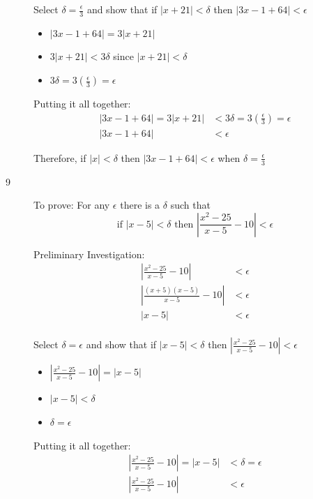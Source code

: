 \documentclass{exam}
\begin{document}
\begin{description}
Select $\delta = \frac{\epsilon}{3}$ and show that if $|x + 21| < \delta$ then $|3x - 1 + 64| < \epsilon$

\begin{itemize}
  \item $|3x - 1 + 64| = 3|x + 21|$
  \item $3|x + 21| < 3 \delta$ since $|x + 21| < \delta$
  \item $3 \delta = 3 \left( \frac{\epsilon}{3} \right) = \epsilon$
\end{itemize}

Putting it all together:
\begin{align*}
  |3x - 1 + 64| = 3|x + 21| &< 3 \delta = 3 \left( \frac{\epsilon}{3} \right) = \epsilon \\
  |3x - 1 + 64| &< \epsilon
\end{align*}

Therefore, if $|x| < \delta$ then $|3x - 1 + 64| < \epsilon$ when $\delta = \frac{\epsilon}{3}$

\item[9]
To prove: For any $\epsilon$ there is a $\delta$ such that 
\[
  \text{if } |x - 5| < \delta \text{ then } \left|\frac{x^2 - 25}{x-5} - 10\right| < \epsilon
\]

Preliminary Investigation:
\begin{align*}
  \left| \frac{x^2 - 25}{x-5} - 10 \right| &< \epsilon \\
  \left| \frac{(x+5)(x-5)}{x-5} - 10 \right| &< \epsilon \\
  |x - 5| &< \epsilon \\
\end{align*}

Select $\delta = \epsilon$ and show that if $|x - 5| < \delta$ then $\left| \frac{x^2 - 25}{x-5} - 10 \right| < \epsilon$

\begin{itemize}
  \item $\left| \frac{x^2 - 25}{x-5} - 10 \right| = \left| x - 5 \right|$
  \item $\left| x - 5 \right| < \delta$
  \item $\delta = \epsilon$
\end{itemize}

Putting it all together:
\begin{align*}
  \left| \frac{x^2 - 25}{x-5} - 10 \right| = | x - 5 | &< \delta = \epsilon \\ 
  \left| \frac{x^2 - 25}{x-5} - 10 \right| &< \epsilon \\ 
\end{align*}


\end{description}
\end{document}

